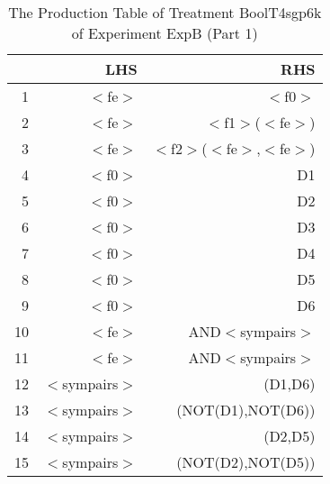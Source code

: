 \begin{table}[ht]
\centering
\begin{tabular}{rrr}
  \hline
 & LHS & RHS \\ 
  \hline
1 & $<$fe$>$ & $<$f0$>$ \\ 
  2 & $<$fe$>$ & $<$f1$>$($<$fe$>$) \\ 
  3 & $<$fe$>$ & $<$f2$>$($<$fe$>$,$<$fe$>$) \\ 
  4 & $<$f0$>$ & D1 \\ 
  5 & $<$f0$>$ & D2 \\ 
  6 & $<$f0$>$ & D3 \\ 
  7 & $<$f0$>$ & D4 \\ 
  8 & $<$f0$>$ & D5 \\ 
  9 & $<$f0$>$ & D6 \\ 
  10 & $<$fe$>$ & AND$<$sympairs$>$ \\ 
  11 & $<$fe$>$ & AND$<$sympairs$>$ \\ 
  12 & $<$sympairs$>$ & (D1,D6) \\ 
  13 & $<$sympairs$>$ & (NOT(D1),NOT(D6)) \\ 
  14 & $<$sympairs$>$ & (D2,D5) \\ 
  15 & $<$sympairs$>$ & (NOT(D2),NOT(D5)) \\ 
   \hline
\end{tabular}
\caption{The Production Table of Treatment BoolT4sgp6k of Experiment ExpB (Part 1)} 
\end{table}

